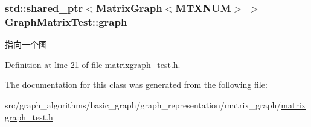 \subsubsection[{graph}]{\setlength{\rightskip}{0pt plus 5cm}std\+::shared\+\_\+ptr$<${\bf Matrix\+Graph}$<${\bf M\+T\+X\+N\+U\+M}$>$ $>$ Graph\+Matrix\+Test\+::graph\hspace{0.3cm}{\ttfamily [protected]}}\label{class_graph_matrix_test_a466258802e52f0a5408f78e809cd6d7c}
指向一个图 

Definition at line 21 of file matrixgraph\+\_\+test.\+h.



The documentation for this class was generated from the following file\+:\begin{DoxyCompactItemize}
\item 
src/graph\+\_\+algorithms/basic\+\_\+graph/graph\+\_\+representation/matrix\+\_\+graph/\hyperlink{matrixgraph__test_8h}{matrixgraph\+\_\+test.\+h}\end{DoxyCompactItemize}
